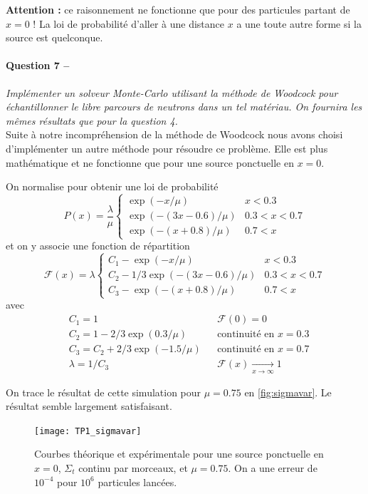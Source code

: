 \documentclass[11pt,a4paper]{article}
\newcommand{\question}[2]{\paragraph{Question #1 --}\hspace{-7pt}\textit{#2} \\}
\newcommand{\F}{\mathcal{F}}
\begin{document}
\textbf{Attention : } ce raisonnement ne fonctionne que pour des particules partant de $x=0$ ! La loi de probabilité d'aller à une distance $x$ a une toute autre forme si la source est quelconque.

\question{7}{Implémenter un solveur Monte-Carlo utilisant la méthode de Woodcock pour échantillonner le libre parcours de neutrons dans un tel matériau. On fournira les mêmes résultats que pour la question 4.}

Suite à notre incompréhension de la méthode de Woodcock nous avons choisi d'implémenter un autre méthode pour résoudre ce problème. Elle est plus mathématique et ne fonctionne que pour une source ponctuelle en $x=0$.

On normalise pour obtenir une loi de probabilité
\begin{equation}
  P(x) = \frac{\lambda}{\mu}
  \begin{cases}
    \exp(-x/\mu)         & x<0.3\\
    \exp(-(3x-0.6)/\mu) & 0.3<x<0.7\\
    \exp(-(x+0.8)/\mu)  & 0.7<x
  \end{cases}
\end{equation}
et on y associe une fonction de répartition
\begin{equation}
  \F(x) = \lambda
  \begin{cases}
    C_1 - \exp(-x/\mu)             & x<0.3\\    
    C_2 - 1/3 \exp(-(3x-0.6)/\mu) & 0.3<x<0.7\\
    C_3 - \exp(-(x+0.8)/\mu)      & 0.7<x      
  \end{cases}
\end{equation}
avec
\begin{align}
  &C_1 = 1 && \F(0)=0 \\
  &C_2 = 1 - 2/3 \exp(0.3/\mu) && \mbox{continuité en }x=0.3 \\
  &C_3 = C_2 + 2/3 \exp(-1.5/\mu) &&  \mbox{continuité en }x=0.7 \\
  &\lambda = 1/C_3 &&  \F(x)  \xrightarrow[x \to \infty]{} 1
\end{align}

On trace le résultat de cette simulation pour $\mu=0.75$ en \autoref{fig:sigmavar}. Le résultat semble largement satisfaisant.
\begin{figure}
  \centering
  \texttt{[image: TP1\_sigmavar]}
  \caption{Courbes théorique et expérimentale pour une source ponctuelle en $x=0$, $\Sigma_t$ continu par morceaux, et $\mu=0.75$. On a une erreur de $10^{-4}$ pour $10^6$ particules lancées.}
  \label{fig:sigmavar}
\end{figure}
\end{document}
